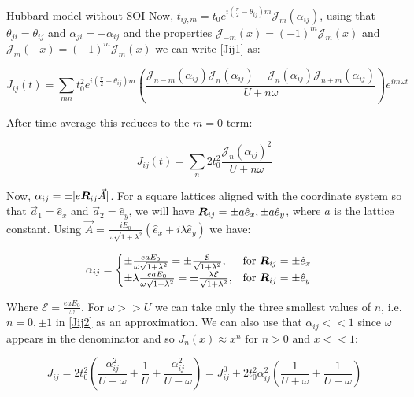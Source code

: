 \begin{section}{Hubbard model without SOI}
Now, $t_{ij,m} = t_0 e^{i(\frac{\pi}{2}-\theta_{ij})m} \mathcal{J}_m(\alpha_{ij})$, using that $\theta_{ji} = \theta_{ij}$ and $\alpha_{ji} = -\alpha_{ij}$ and the properties $\mathcal{J}_{-m}(x) = (-1)^m\mathcal{J}_m(x)$ and $\mathcal{J}_m(-x) = (-1)^m\mathcal{J}_m(x)$ we can write \ref{Jij1} as:

\begin{equation}
J_{ij}(t) = \sum_{mn} t_0^2 e^{i(\frac{\pi}{2}-\theta_{ij})m}\left(\frac{\mathcal{J}_{n-m}(\alpha_{ij})\mathcal{J}_{n}(\alpha_{ij})+\mathcal{J}_{n}(\alpha_{ij})\mathcal{J}_{n+m}(\alpha_{ij})}{U+n\omega} \right) e^{im\omega t}
\end{equation}

After time average this reduces to the $m=0$ term:

\begin{equation}
\label{Jij2}
J_{ij}(t) = \sum_{n} 2t_0^2 \frac{\mathcal{J}_n(\alpha_{ij})^2}{U+n\omega}
\end{equation}

Now, $\alpha_{ij} = \pm|e\boldsymbol{R}_{ij}\vec{A}|$. For a square lattices aligned with the coordinate system so that $\vec{a}_1=\hat{e}_x$ and $\vec{a}_2=\hat{e}_y$, we will have $\boldsymbol{R}_{ij} = \pm a\hat{e}_x,\pm a\hat{e}_y$, where $a$ is the lattice constant. Using $\vec{A}=\frac{iE_0}{\omega\sqrt{1+\lambda^2}}(\hat{e}_x+i\lambda\hat{e}_y)$ we have:

\begin{equation}
\alpha_{ij} = \begin{cases}
             \pm \frac{eaE_0}{\omega \sqrt{1+\lambda^2}} = \pm \frac{\mathcal{E}}{\sqrt{1+\lambda^2}},  & \text{for } \boldsymbol{R}_{ij} = \pm \hat{e}_x \\
             \pm \lambda\frac{eaE_0}{\omega \sqrt{1+\lambda^2}} = \pm \frac{\lambda \mathcal{E}}{\sqrt{1+\lambda^2}},  & \text{for } \boldsymbol{R}_{ij} = \pm \hat{e}_y
       \end{cases} \quad
\end{equation}

Where $\mathcal{E} = \frac{eaE_0}{\omega}$. For $\omega>>U$ we can take only the three smallest values of $n$, i.e. $n=0, \pm 1$ in \ref{Jij2} as an approximation. We can also use that $\alpha_{ij} << 1$ since $\omega$ appears in the denominator and so $J_n(x) \approx x^n \text{ for } n>0 \text{ and } x << 1$:

\begin{equation}
J_{ij} = 2t_0^2 \left(\frac{\alpha_{ij}^2}{U+\omega} +\frac{1}{U} +\frac{\alpha_{ij}^2}{U-\omega} \right) = J_{ij}^0 + 2t_0^2 \alpha_{ij}^2 \left( \frac{1}{U+\omega} + \frac{1}{U-\omega} \right)
\end{equation}


\end{section}
